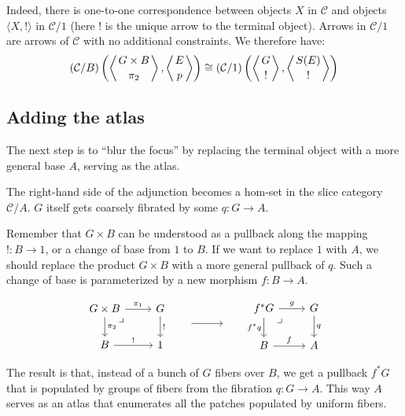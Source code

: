\documentclass[DaoFP]{subfiles}
\begin{document}
Indeed, there is one-to-one correspondence between objects $X$ in $\mathcal{C}$ and objects $\langle X, ! \rangle$ in  $\mathcal{C}/1$ (here $!$ is the unique arrow to the terminal object). Arrows in $\mathcal{C}/1$ are arrows of $\mathcal{C}$ with no additional constraints. We therefore have:
\[(\mathcal{C}/B) \left( \left \langle {G\times B \atop \pi_2} \right \rangle , \left \langle {E \atop p } \right \rangle \right) \cong (\mathcal{C}/1)  \left( \left \langle {G \atop !} \right \rangle , \left \langle {S(E) \atop ! } \right \rangle \right)  \]

\subsection{Adding the atlas}

The next step is to ``blur the focus'' by replacing the terminal object with a more general base $A$, serving as the atlas.

The right-hand side of the adjunction becomes a hom-set in the slice category $\mathcal{C}/A$. $G$ itself gets coarsely fibrated by some $q \colon G \to A$. 

Remember that $G \times B$ can be understood as a pullback along the mapping $! \colon B \to 1$, or a change of base from $1$ to $B$. If we want to replace $1$ with $A$, we should replace the product $G \times B$ with a more general pullback of $q$. Such a change of base is parameterized by a new morphism $f \colon B \to A$.

\[
 \begin{tikzcd}
 G \times B
 \arrow[dr, phantom,  , very near start, "\lrcorner"]
\arrow[d, "\pi_2"]
 \arrow[r, "\pi_1"]
 & G
 \arrow[d, "!"]
 \\
 B
 \arrow[r, "!"]
 &
 1
 \end{tikzcd}
 \hspace{20pt}
\begin{tikzpicture}
\draw[->] (0, 0) -- (1, 0);
\end{tikzpicture}
 \hspace{20pt}
 \begin{tikzcd}
 f^* G
\arrow[dr, phantom,  , very near start, "\lrcorner"]
 \arrow[d, "f^*q"']
 \arrow[r, "g"]
 & G
 \arrow[d, "q"]
 \\
 B
 \arrow[r, "f"]
 &A
\end{tikzcd}
\]

The result is that, instead of a bunch of $G$ fibers over $B$, we get a pullback $f^* G$ that is populated by groups of fibers from the fibration $q \colon G \to A$. This way $A$ serves as an atlas that enumerates all the patches populated by uniform fibers. 
\end{document}
